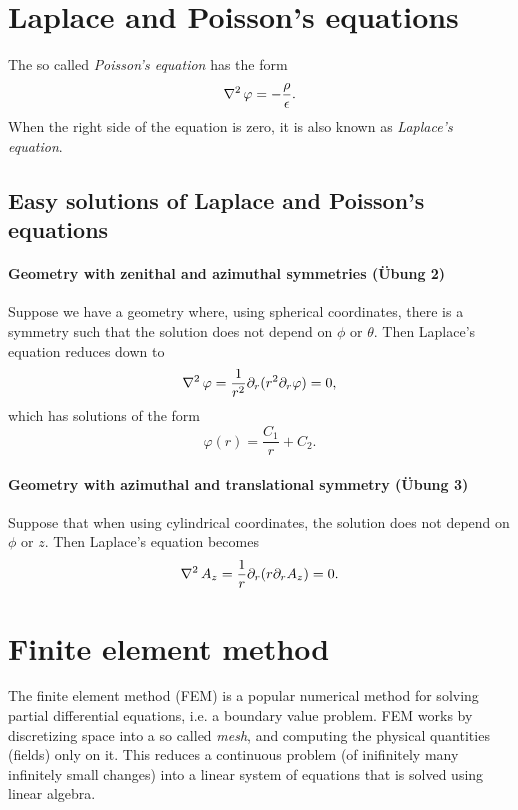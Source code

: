 \documentclass[margin=small]{tex/hsrzf}
\theoremstyle{elmagzf}
\begin{document}
\section{Laplace and Poisson's equations} \label{sec:poisson}

The so called \emph{Poisson's equation} has the form
\[
  \operatorname{\nabla^2} \varphi = - \frac{\rho}{\epsilon}.
\]
When the right side of the equation is zero, it is also known as \emph{Laplace's
equation}.

\subsection{Easy solutions of Laplace and Poisson's equations}

\paragraph{Geometry with zenithal and azimuthal symmetries (\"Ubung 2)}

Suppose we have a geometry where, using spherical coordinates, there is a
symmetry such that the solution does not depend on \(\phi\) or \(\theta\).
Then Laplace's equation reduces down to
\[
  \operatorname{\nabla^2} \varphi = \frac{1}{r^2} \partial_r ( r^2 \partial_r \varphi) = 0,
\]
which has solutions of the form
\[
  \varphi(r) = \frac{C_1}{r} + C_2.
\]

\paragraph{Geometry with azimuthal and translational symmetry (\"Ubung 3)}

Suppose that when using cylindrical coordinates, the solution does not depend
on \(\phi\) or \(z\). Then Laplace's equation becomes
\[
  \operatorname{\nabla^2} A_z = \frac{1}{r} \partial_r (r \partial_r A_z) = 0.
\]

\section{Finite element method}

The finite element method (FEM) is a popular numerical method for solving
partial differential equations, i.e. a boundary value problem. FEM works by
discretizing space into a so called \emph{mesh}, and computing the physical
quantities (fields) only on it. This reduces a continuous problem (of
inifinitely many infinitely small changes) into a linear system of equations
that is solved using linear algebra.
\end{document}
